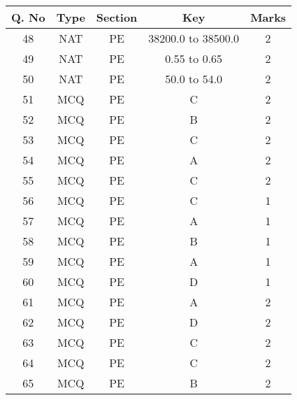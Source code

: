 \newpage
\begin{tabular}{|c|c|c|c|c|}
\hline
Q. No&Type&Section&Key&Marks\\
\hline
48&NAT&PE&38200.0 to 38500.0&2\\
\hline
49&NAT&PE&0.55 to 0.65&2\\
\hline
50&NAT&PE&50.0 to 54.0&2\\
\hline
51&MCQ&PE&C&2\\
\hline
52&MCQ&PE&B&2\\
\hline
53&MCQ&PE&C&2\\
\hline
54&MCQ&PE&A&2\\
\hline
55&MCQ&PE&C&2\\
\hline
56&MCQ&PE&C&1\\
\hline
57&MCQ&PE&A&1\\
\hline
58&MCQ&PE&B&1\\
\hline
59&MCQ&PE&A&1\\
\hline
60&MCQ&PE&D&1\\
\hline
61&MCQ&PE&A&2\\
\hline
62&MCQ&PE&D&2\\
\hline
63&MCQ&PE&C&2\\
\hline
64&MCQ&PE&C&2\\
\hline
65&MCQ&PE&B&2\\
\hline
\end{tabular}